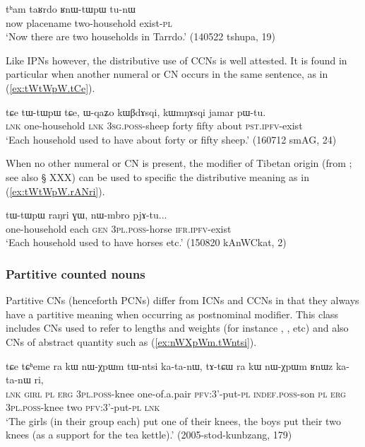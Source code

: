 \begin{exe}
\ex \label{ex:taRrdp.RnWtWpW}
\gll tʰam taʁrdo ʁnɯ-tɯpɯ tu-nɯ \\
now placename two-household exist-\textsc{pl} \\
\glt `Now there are two households in Tarrdo.' (140522 tshupa, 19)
\end{exe} 

Like IPNs however, the distributive use of CCNs is well attested. It is found in particular when another numeral or CN occurs in the same sentence, as in (\ref{ex:tWtWpW.tCe}).

\begin{exe}
\ex \label{ex:tWtWpW.tCe}
\gll tɕe tɯ-tɯpɯ tɕe, ɯ-qaʑo kɯβdɤsqi, kɯmŋɤsqi jamar pɯ-tu. \\
\textsc{lnk} one-household \textsc{lnk} \textsc{3sg}.\textsc{poss}-sheep forty fifty about \textsc{pst}.\textsc{ipfv}-exist \\
\glt `Each household used to have about forty or fifty sheep.' (160712 smAG, 24)
\end{exe} 

When no other numeral or CN is present, the modifier of Tibetan origin  (from ; see also § XXX) can be used to specific the distributive meaning as in (\ref{ex:tWtWpW.rANri}).

\begin{exe}
\ex \label{ex:tWtWpW.rANri}
\gll tɯ-tɯpɯ raŋri ɣɯ, nɯ-mbro pjɤ-tu... \\
one-household  each \textsc{gen} \textsc{3pl}.\textsc{poss}-horse \textsc{ifr}.\textsc{ipfv}-exist \\
\glt `Each household used to have horses etc.' (150820 kAnWCkat, 2)
\end{exe} 

\subsubsection{Partitive counted nouns} \label{sec:CN.partitive}
Partitive CNs (henceforth PCNs) differ from ICNs and CCNs in that they always have a partitive meaning when occurring as postnominal modifier. This class includes CNs used to refer to lengths and weights (for instance , ,  etc) and also CNs of abstract quantity such as  (\ref{ex:nWXpWm.tWntsi}).

\begin{exe}
\ex \label{ex:nWXpWm.tWntsi}
 \gll tɕe tɕʰeme ra kɯ nɯ-χpɯm tɯ-ntsi ka-ta-nɯ, tɤ-tɕɯ ra kɯ nɯ-χpɯm ʁnɯz ka-ta-nɯ ri,  \\
 \textsc{lnk} \textsc{girl} \textsc{pl} \textsc{erg} \textsc{3pl}.\textsc{poss}-knee one-of.a.pair \textsc{pfv}:3'-put-\textsc{pl} \textsc{indef}.\textsc{poss}-son \textsc{pl} \textsc{erg}  \textsc{3pl}.\textsc{poss}-knee two \textsc{pfv}:3'-put-\textsc{pl} \textsc{lnk} \\
 \glt `The girls (in their group each) put one of their knees, the boys put their two knees (as a support for the tea kettle).' (2005-stod-kunbzang, 179)
\end{exe}

